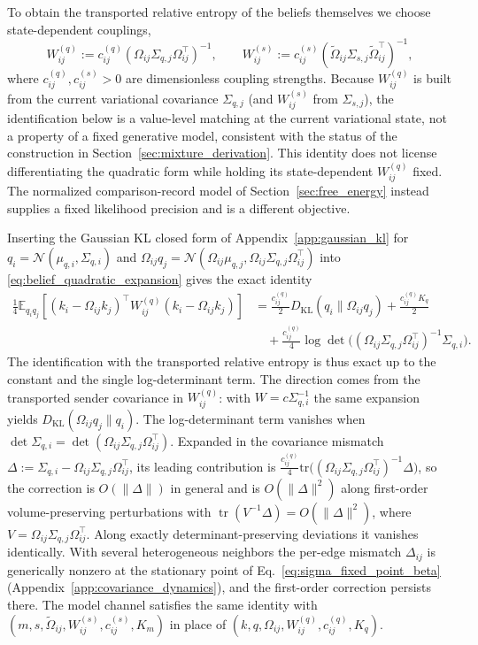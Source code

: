 To obtain the transported relative entropy of the beliefs themselves we choose state-dependent couplings,
\begin{equation}
W^{(q)}_{ij}:=c^{(q)}_{ij}(\Omega_{ij}\Sigma_{q,j}\Omega_{ij}^\top)^{-1},
\qquad
W^{(s)}_{ij}:=c^{(s)}_{ij}(\tilde{\Omega}_{ij}\Sigma_{s,j}\tilde{\Omega}_{ij}^\top)^{-1},
\end{equation}
where $c^{(q)}_{ij}, c^{(s)}_{ij} > 0$ are dimensionless coupling strengths. Because $W^{(q)}_{ij}$ is built from the current variational covariance $\Sigma_{q,j}$ (and $W^{(s)}_{ij}$ from $\Sigma_{s,j}$), the identification below is a value-level matching at the current variational state, not a property of a fixed generative model, consistent with the status of the construction in Section~\ref{sec:mixture_derivation}. This identity does not license differentiating the quadratic form while holding its state-dependent $W^{(q)}_{ij}$ fixed. The normalized comparison-record model of Section~\ref{sec:free_energy} instead supplies a fixed likelihood precision and is a different objective.

Inserting the Gaussian KL closed form of Appendix~\ref{app:gaussian_kl} for $q_i = \mathcal{N}(\mu_{q,i},\Sigma_{q,i})$ and $\Omega_{ij}q_j = \mathcal{N}(\Omega_{ij}\mu_{q,j}, \Omega_{ij}\Sigma_{q,j}\Omega_{ij}^\top)$ into \eqref{eq:belief_quadratic_expansion} gives the exact identity
\begin{equation}
\begin{aligned}
\frac{1}{4}\mathbb{E}_{q_i q_j}
[(k_i-\Omega_{ij}k_j)^\top W^{(q)}_{ij}(k_i-\Omega_{ij}k_j)]
&=
\frac{c^{(q)}_{ij}}{2}D_{\mathrm{KL}}(q_i\|\Omega_{ij}q_j)+\frac{c^{(q)}_{ij}K_q}{2}\\
&\quad+\frac{c^{(q)}_{ij}}{4}\log\det\big((\Omega_{ij}\Sigma_{q,j}\Omega_{ij}^\top)^{-1}\Sigma_{q,i}\big).
\end{aligned}
\label{eq:quadratic_kl_identity}
\end{equation}
The identification with the transported relative entropy is thus exact up to the constant and the single log-determinant term. The direction comes from the transported sender covariance in $W^{(q)}_{ij}$: with $W = c\Sigma_{q,i}^{-1}$ the same expansion yields $D_{\mathrm{KL}}(\Omega_{ij}q_j\|q_i)$. The log-determinant term vanishes when $\det\Sigma_{q,i} = \det(\Omega_{ij}\Sigma_{q,j}\Omega_{ij}^\top)$. Expanded in the covariance mismatch $\Delta := \Sigma_{q,i} - \Omega_{ij}\Sigma_{q,j}\Omega_{ij}^\top$, its leading contribution is $\tfrac{c^{(q)}_{ij}}{4}\mathrm{tr}\big((\Omega_{ij}\Sigma_{q,j}\Omega_{ij}^\top)^{-1}\Delta\big)$, so the correction is $O(\|\Delta\|)$ in general and is $O(\|\Delta\|^2)$ along first-order volume-preserving perturbations with $\operatorname{tr}(V^{-1}\Delta)=O(\|\Delta\|^2)$, where $V=\Omega_{ij}\Sigma_{q,j}\Omega_{ij}^\top$. Along exactly determinant-preserving deviations it vanishes identically. With several heterogeneous neighbors the per-edge mismatch $\Delta_{ij}$ is generically nonzero at the stationary point of Eq.~\eqref{eq:sigma_fixed_point_beta} (Appendix~\ref{app:covariance_dynamics}), and the first-order correction persists there. The model channel satisfies the same identity with $(m, s, \tilde\Omega_{ij}, W^{(s)}_{ij}, c^{(s)}_{ij}, K_m)$ in place of $(k, q, \Omega_{ij}, W^{(q)}_{ij}, c^{(q)}_{ij}, K_q)$.
